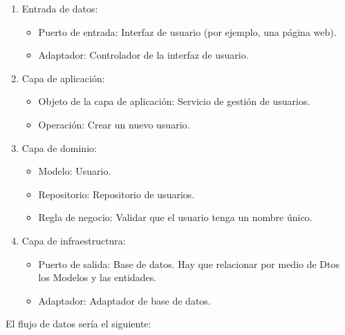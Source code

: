 \documentclass[executivepaper]{article}
\begin{document}
\begin{enumerate}
    \item Entrada de datos:
    \begin{itemize}
        \item Puerto de entrada: Interfaz de usuario (por ejemplo, una página web).
        \item Adaptador: Controlador de la interfaz de usuario.
    \end{itemize}
    \item Capa de aplicación:
    \begin{itemize}
        \item Objeto de la capa de aplicación: Servicio de gestión de usuarios.
        \item Operación: Crear un nuevo usuario.
    \end{itemize}
    \item Capa de dominio:
    \begin{itemize}
        \item Modelo: Usuario.
        \item Repositorio: Repositorio de usuarios.
        \item Regla de negocio: Validar que el usuario tenga un nombre único.
    \end{itemize}
    \item Capa de infraestructura:
    \begin{itemize}
        \item Puerto de salida: Base de datos. Hay que relacionar por medio de Dtos los Modelos y las entidades.
        \item Adaptador: Adaptador de base de datos.
    \end{itemize}
\end{enumerate}

El flujo de datos sería el siguiente:
\end{document}
